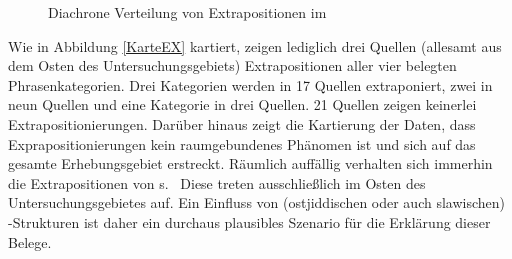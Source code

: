     \begin{figure}
\fittable{
	\begin{tikzpicture}
		\begin{axis}[only marks, width=0.82\textwidth,height=0.24\textheight,
		legend style={at={(1,1)},xshift=+0.2cm, yshift=-0.16cm,anchor=north west,nodes=left},
			xtick={1700, 1725, 1750, 1775, 1800, 1825, 1850, 1875, 1900, 1925, 1950, 1975}, ytick=\empty,
			x tick label style={/pgf/number format/1000 sep=}, 
			y tick label style={/pgf/number format/1000 sep=},
			extra y tick style={grid=major,
				tick label style={, ,}},
				ymin=0.1,
				ymax=6,
			ylabel={Phänomenbelege},
			enlarge x limits=0.03]	
	
		



\addplot  [mark=o, black] table [x=jahr, y=no] {figures/EX_no.txt};%

\addplot  [mark=*, red] table [x=jahr, y=ADV] {figures/EX_ADV.txt};%
\addplot  [mark=*, orange] table [x=jahr, y=AP] {figures/EX_AP.txt};%
\addplot  [thick, mark=*, green] table [x=jahr, y=PP] {figures/EX_PP.txt};%
\addplot  [thick, mark=*, blue] table [x=jahr, y=NP] {figures/EX_NP.txt};%

 

				\legend{ keine Extrapositionen, \hai{{\AdvP}}–\isi{Extraposition}, \hai{{\AP}}–\isi{Extraposition}, \hai{{\PP}}–\isi{Extraposition},\hai{{\NP}}–Extraposition} %
		\end{axis}
	\end{tikzpicture}
}
	\caption{Diachrone Verteilung von Extrapositionen im }
	\label{histoEX}	
\end{figure}



  Wie in Abbildung \ref{KarteEX} kartiert, zeigen lediglich drei Quellen (allesamt aus dem Osten des Untersuchungsgebiets) Extrapositionen aller vier belegten Phrasenkategorien. Drei Kategorien werden in 17 Quellen extraponiert, zwei in neun Quellen und eine Kategorie in drei Quellen. 21 Quellen zeigen keinerlei Extrapositionierungen. Darüber hinaus zeigt die Kartierung der Daten, dass Exprapositionierungen kein raumgebundenes Phänomen ist und sich auf das gesamte Erhebungsgebiet erstreckt. Räumlich auffällig verhalten sich immerhin die Extrapositionen von \hai{{\AdvP}}s. \,%
  Diese treten ausschließlich im Osten des Untersuchungsgebietes auf. Ein Einfluss von (ostjiddischen oder auch slawischen) \hai{{\VO}}-Strukturen ist daher ein durchaus plausibles Szenario für die Erklärung dieser Belege. 
  
